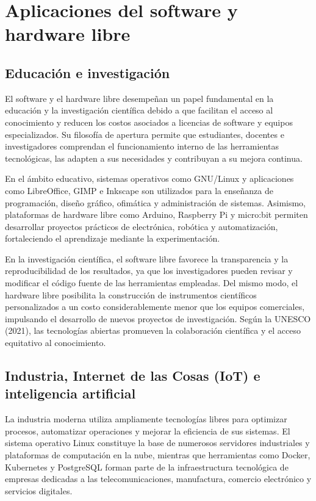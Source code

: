 \documentclass[12pt]{article}
\begin{document}
	\section{Aplicaciones del software y hardware libre}
	\subsection{Educación e investigación}
	
	El software y el hardware libre desempeñan un papel fundamental en la educación y la investigación científica debido a que facilitan el acceso al conocimiento y reducen los costos asociados a licencias de software y equipos especializados. Su filosofía de apertura permite que estudiantes, docentes e investigadores comprendan el funcionamiento interno de las herramientas tecnológicas, las adapten a sus necesidades y contribuyan a su mejora continua.
	
	En el ámbito educativo, sistemas operativos como GNU/Linux y aplicaciones como LibreOffice, GIMP e Inkscape son utilizados para la enseñanza de programación, diseño gráfico, ofimática y administración de sistemas. Asimismo, plataformas de hardware libre como Arduino, Raspberry Pi y micro:bit permiten desarrollar proyectos prácticos de electrónica, robótica y automatización, fortaleciendo el aprendizaje mediante la experimentación.
	
	En la investigación científica, el software libre favorece la transparencia y la reproducibilidad de los resultados, ya que los investigadores pueden revisar y modificar el código fuente de las herramientas empleadas. Del mismo modo, el hardware libre posibilita la construcción de instrumentos científicos personalizados a un costo considerablemente menor que los equipos comerciales, impulsando el desarrollo de nuevos proyectos de investigación. Según la UNESCO (2021), las tecnologías abiertas promueven la colaboración científica y el acceso equitativo al conocimiento.
	\subsection{Industria, Internet de las Cosas (IoT) e inteligencia artificial}
	
	La industria moderna utiliza ampliamente tecnologías libres para optimizar procesos, automatizar operaciones y mejorar la eficiencia de sus sistemas. El sistema operativo Linux constituye la base de numerosos servidores industriales y plataformas de computación en la nube, mientras que herramientas como Docker, Kubernetes y PostgreSQL forman parte de la infraestructura tecnológica de empresas dedicadas a las telecomunicaciones, manufactura, comercio electrónico y servicios digitales.
	
\end{document}
